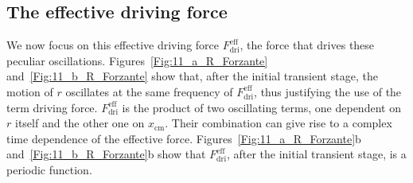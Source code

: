 \subsection{The effective driving force}
We now focus on this effective driving force $F_{\text{dri}}^{\text{eff}}$, the force that drives these peculiar oscillations. Figures~\ref{Fig:11_a_R_Forzante} and~\ref{Fig:11_b_R_Forzante} show that, after the initial transient stage, the motion of $r$ oscillates at the same frequency of $F_{\text{dri}}^{\text{eff}}$, thus justifying the use of the term driving force. $F_{\text{dri}}^{\text{eff}}$ is the product of two oscillating terms, one dependent on $r$ itself and the other one on $x_\text{cm}$. Their combination can give rise to a complex time dependence of the effective force. Figures~\ref{Fig:11_a_R_Forzante}b and~\ref{Fig:11_b_R_Forzante}b show that $F_{\text{dri}}^{\text{eff}}$, after the initial transient stage, is a periodic function. 

